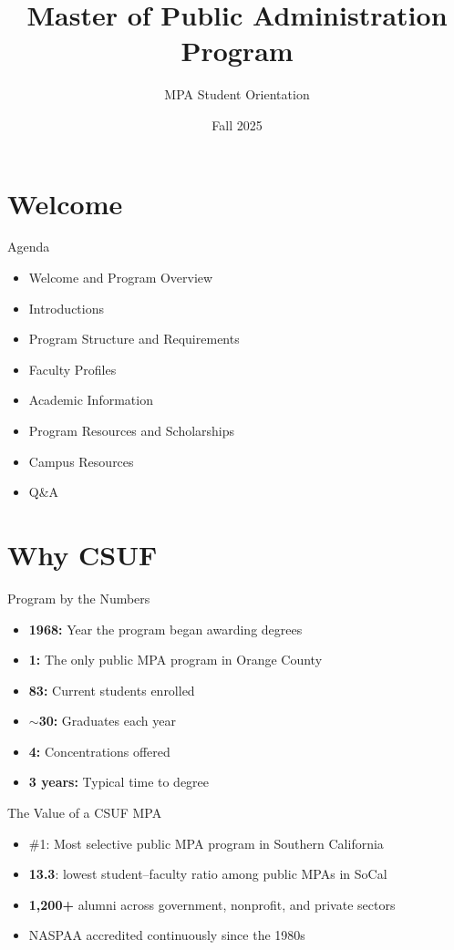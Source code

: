 \documentclass[10pt]{beamer}
\title{Master of Public Administration Program}
\subtitle{MPA Student Orientation}
\date{Fall 2025}
\begin{document}

\maketitle

\section{Welcome}
\begin{frame}{Agenda}
\begin{itemize}
  \item Welcome and Program Overview
  \item Introductions
  \item Program Structure and Requirements
  \item Faculty Profiles
  \item Academic Information
  \item Program Resources and Scholarships
  \item Campus Resources
  \item Q\&A
\end{itemize}
\end{frame}

\section{Why CSUF}
\begin{frame}{Program by the Numbers}
\begin{itemize}
  \item \textbf{1968:} Year the program began awarding degrees
  \item \textbf{1:} The only public MPA program in Orange County
  \item \textbf{83:} Current students enrolled
  \item \textbf{\(\sim\)30:} Graduates each year
  \item \textbf{4:} Concentrations offered
  \item \textbf{3 years:} Typical time to degree
\end{itemize}
\end{frame}

\begin{frame}{The Value of a CSUF MPA}
\begin{itemize}
  \item \#1: Most selective public MPA program in Southern California
  \item \textbf{13.3}: lowest student–faculty ratio among public MPAs in SoCal
  \item \textbf{1,200+} alumni across government, nonprofit, and private sectors
  \item NASPAA accredited continuously since the 1980s
\end{itemize}
\end{frame}
\end{document}
